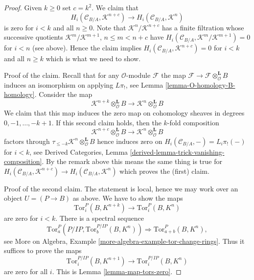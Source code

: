 \documentclass{stacks-project}
\theoremstyle{plain}
\theoremstyle{definition}
\theoremstyle{remark}
\numberwithin{equation}{subsection}
\begin{document}
\begin{proof}
\medskip\noindent
Given $k \geq 0$ set $c = k^2$. We claim that
$$
H_i(\mathcal{C}_{B/A}, \mathcal{K}^{n + c}) \to
H_i(\mathcal{C}_{B/A}, \mathcal{K}^n)
$$
is zero for $i < k$ and all $n \geq 0$. Note that
$\mathcal{K}^n/\mathcal{K}^{n + c}$ has a finite filtration whose successive
quotients $\mathcal{K}^m/\mathcal{K}^{m + 1}$, $n \leq m < n + c$
have $H_i(\mathcal{C}_{B/A}, \mathcal{K}^m/\mathcal{K}^{m + 1}) = 0$
for $i < n$ (see above). Hence the claim implies
$H_i(\mathcal{C}_{B/A}, \mathcal{K}^{n + c}) = 0$ for $i < k$ and all
$n \geq k$ which is what we need to show.

\medskip\noindent
Proof of the claim. Recall that for any $\mathcal{O}$-module $\mathcal{F}$
the map $\mathcal{F} \to \mathcal{F} \otimes_\mathcal{O}^\mathbf{L} B$
induces an isomorphism on applying $L\pi_!$, see
Lemma \ref{lemma-O-homology-B-homology}.
Consider the map
$$
\mathcal{K}^{n + k} \otimes_\mathcal{O}^\mathbf{L} B
\longrightarrow
\mathcal{K}^n \otimes_\mathcal{O}^\mathbf{L} B
$$
We claim that this map induces the zero map on cohomology sheaves
in degrees $0, -1, \ldots, - k + 1$. If this second claim holds, then
the $k$-fold composition
$$
\mathcal{K}^{n + c} \otimes_\mathcal{O}^\mathbf{L} B
\longrightarrow
\mathcal{K}^n \otimes_\mathcal{O}^\mathbf{L} B
$$
factors through $\tau_{\leq -k}\mathcal{K}^n \otimes_\mathcal{O}^\mathbf{L} B$
hence induces zero on $H_i(\mathcal{C}_{B/A}, -) = L_i\pi_!( - )$
for $i < k$, see
Derived Categories, Lemma \ref{derived-lemma-trick-vanishing-composition}.
By the remark above this means the same thing is true for
$H_i(\mathcal{C}_{B/A}, \mathcal{K}^{n + c}) \to
H_i(\mathcal{C}_{B/A}, \mathcal{K}^n)$
which proves the (first) claim.

\medskip\noindent
Proof of the second claim. The statement is local, hence we may work
over an object $U = (P \to B)$ as above. We have to show
the maps
$$
\text{Tor}_i^P(B, K^{n + k}) \to \text{Tor}_i^P(B, K^n)
$$
are zero for $i < k$. There is a spectral sequence
$$
\text{Tor}_a^P(P/IP, \text{Tor}_b^{P/IP}(B, K^n))
\Rightarrow
\text{Tor}_{a + b}^P(B, K^n),
$$
see More on Algebra, Example \ref{more-algebra-example-tor-change-rings}.
Thus it suffices to prove the maps
$$
\text{Tor}_i^{P/IP}(B, K^{n + 1}) \to \text{Tor}_i^{P/IP}(B, K^n)
$$
are zero for all $i$. This is Lemma \ref{lemma-map-tors-zero}.
\end{proof}
\end{document}
